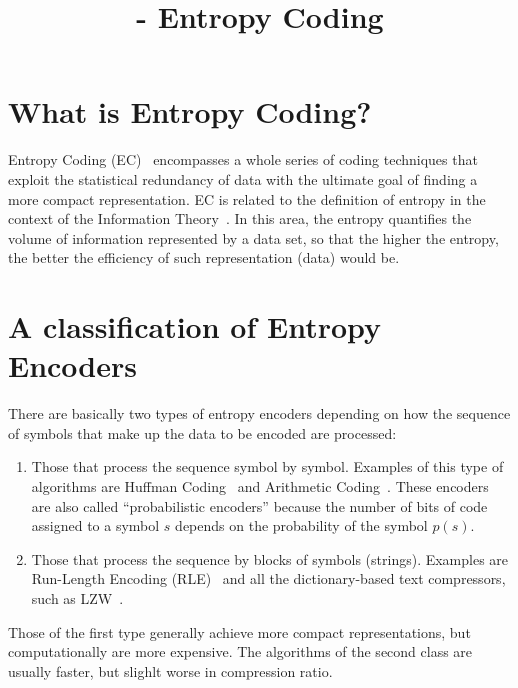 


\title{\SM{} - Entropy Coding}

\maketitle

\tableofcontents

\section{What is Entropy Coding?}

Entropy Coding (EC)~\cite{vruiz__entropy_coding} encompasses a whole
series of coding techniques that exploit the statistical redundancy of
data with the ultimate goal of finding a more compact
representation. EC is related to the definition of entropy in the
context of the Information Theory~\cite{vruiz__information_theory}. In
this area, the entropy quantifies the volume of information
represented by a data set, so that the higher the entropy, the better
the efficiency of such representation (data) would be.

\section{A classification of Entropy Encoders}

There are basically two types of entropy encoders depending on how the
sequence of symbols that make up the data to be encoded are processed:

\begin{enumerate}
\item Those that process the sequence symbol by symbol. Examples of
  this type of algorithms are Huffman
  Coding~\cite{vruiz__huffman_coding} and Arithmetic
  Coding~\cite{vruiz__arithmetic_coding}. These encoders are also
  called ``probabilistic encoders'' because the number of bits of code
  assigned to a symbol $s$ depends on the probability of the symbol
  $p(s)$.
\item Those that process the sequence by blocks of symbols
  (strings). Examples are Run-Length Encoding (RLE)~\cite{vruiz__rle}
  and all the dictionary-based text compressors, such as
  LZW~\cite{vruiz__LZW}.
\end{enumerate}
  
Those of the first type generally achieve more compact
representations, but computationally are more expensive. The
algorithms of the second class are usually faster, but slighlt worse
in compression ratio.

